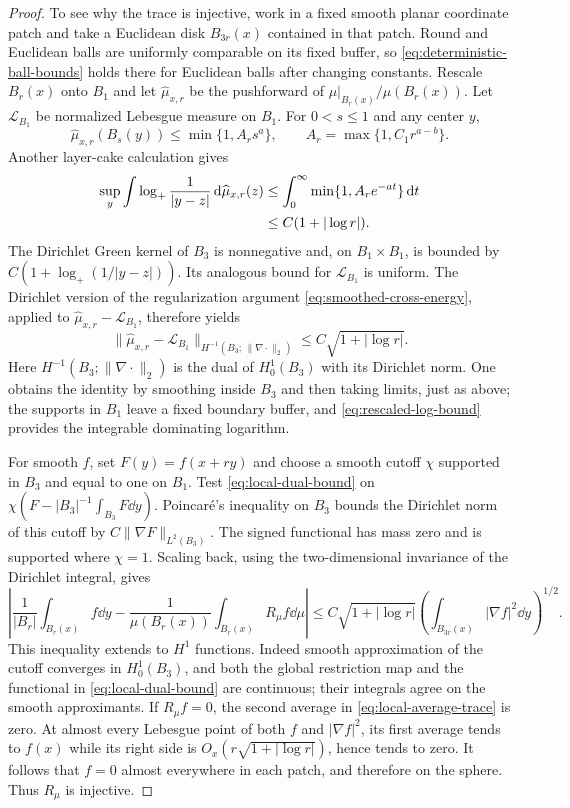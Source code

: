 \begin{proof}
To see why the trace is injective, work in a fixed smooth planar
coordinate patch and take a Euclidean disk $B_{3r}(x)$ contained in that
patch.  Round and Euclidean balls are uniformly comparable on its fixed
buffer, so \eqref{eq:deterministic-ball-bounds} holds there for Euclidean
balls after changing constants.  Rescale $B_r(x)$ onto $B_1$ and let
$\widehat\mu_{x,r}$ be the pushforward of
$\mu|_{B_r(x)}/\mu(B_r(x))$.  Let $\mathcal L_{B_1}$ be normalized
Lebesgue measure on $B_1$.  For $0<s\le1$ and any center $y$,
\[
 \widehat\mu_{x,r}(B_s(y))
 \le\min\{1,A_r s^a\},\qquad
 A_r=\max\{1,C_1 r^{a-b}\}.
\]
Another layer-cake calculation gives
\begin{align}
 \sup_y\int\log_+\frac1{|y-z|}\,\mathrm d\widehat\mu_{x,r}(z)
 &\le\int_0^\infty\min\{1,A_r e^{-at}\}\,\mathrm d t\notag\\
 &\le C(1+|\log r|).\label{eq:rescaled-log-bound}
\end{align}
The Dirichlet Green kernel of $B_3$ is nonnegative and, on
$B_1\times B_1$, is bounded by $C(1+\log_+(1/|y-z|))$.  Its analogous
bound for $\mathcal L_{B_1}$ is uniform.  The Dirichlet version of the
regularization argument \eqref{eq:smoothed-cross-energy}, applied to
$\widehat\mu_{x,r}-\mathcal L_{B_1}$, therefore yields
\begin{equation}\label{eq:local-dual-bound}
 \|\widehat\mu_{x,r}-\mathcal L_{B_1}\|_{H^{-1}(B_3;\,\|\nabla\cdot\|_2)}
       \le C\sqrt{1+|\log r|}.
\end{equation}
Here $H^{-1}(B_3;\|\nabla\cdot\|_2)$ is the dual of $H^1_0(B_3)$ with
its Dirichlet norm.  One obtains the identity by smoothing inside $B_3$
and then taking limits, just as above; the supports in $B_1$ leave a
fixed boundary buffer, and \eqref{eq:rescaled-log-bound} provides the
integrable dominating logarithm.

For smooth $f$, set $F(y)=f(x+ry)$ and choose a smooth cutoff $\chi$
supported in $B_3$ and equal to one on $B_1$.  Test
\eqref{eq:local-dual-bound} on
$\chi(F-|B_3|^{-1}\int_{B_3}F\dd y)$.  Poincar\'e's inequality on $B_3$ bounds
the Dirichlet norm of this cutoff by $C\|\nabla F\|_{L^2(B_3)}$.
The signed functional has mass zero and is supported where $\chi=1$.
Scaling back, using the two-dimensional invariance of the Dirichlet
integral, gives
\begin{equation}\label{eq:local-average-trace}
 \left|\frac{1}{|B_r|}\int_{B_r(x)} f\dd y
       -\frac{1}{\mu(B_r(x))}\int_{B_r(x)}R_\mu f\dd\mu\right|
 \le C\sqrt{1+|\log r|}
       \left(\int_{B_{3r}(x)}|\nabla f|^2\dd y\right)^{1/2}.
\end{equation}
This inequality extends to $H^1$ functions.  Indeed smooth approximation
of the cutoff converges in $H^1_0(B_3)$, and both the global restriction
map and the functional in \eqref{eq:local-dual-bound} are continuous;
their integrals agree on the smooth approximants.  If $R_\mu f=0$, the
second average in \eqref{eq:local-average-trace} is zero.  At almost
every Lebesgue point of both $f$ and $|\nabla f|^2$, its first average
tends to $f(x)$ while its right side is
$O_x(r\sqrt{1+|\log r|})$, hence tends to zero.  It follows that $f=0$
almost everywhere in each patch, and therefore on the sphere.  Thus
$R_\mu$ is injective.


\end{proof}
